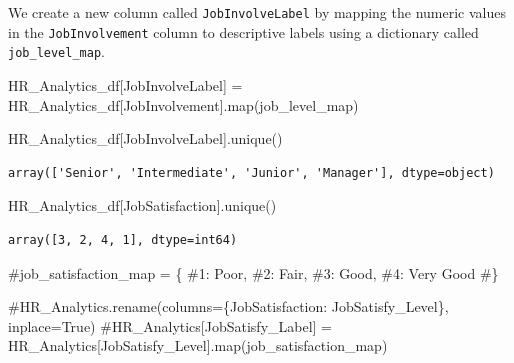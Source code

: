 \documentclass[
  letterpaper,
  DIV=11,
  numbers=noendperiod]{scrartcl}
\newenvironment{Shaded}{\begin{snugshade}}{\end{snugshade}}
\newcommand{\BuiltInTok}[1]{\textcolor[rgb]{0.00,0.23,0.31}{#1}}
\newcommand{\CommentTok}[1]{\textcolor[rgb]{0.37,0.37,0.37}{#1}}
\newcommand{\NormalTok}[1]{\textcolor[rgb]{0.00,0.23,0.31}{#1}}
\newcommand{\OperatorTok}[1]{\textcolor[rgb]{0.37,0.37,0.37}{#1}}
\newcommand{\StringTok}[1]{\textcolor[rgb]{0.13,0.47,0.30}{#1}}
\begin{document}
We create a new column called \texttt{JobInvolveLabel} by mapping the
numeric values in the \texttt{JobInvolvement} column to descriptive
labels using a dictionary called \texttt{job\_level\_map}.

\begin{Shaded}
\begin{Highlighting}[]
\NormalTok{HR\_Analytics\_df[}\StringTok{\textquotesingle{}JobInvolveLabel\textquotesingle{}}\NormalTok{] }\OperatorTok{=}\NormalTok{ HR\_Analytics\_df[}\StringTok{\textquotesingle{}JobInvolvement\textquotesingle{}}\NormalTok{].}\BuiltInTok{map}\NormalTok{(job\_level\_map)}
\end{Highlighting}
\end{Shaded}

\begin{Shaded}
\begin{Highlighting}[]
\NormalTok{HR\_Analytics\_df[}\StringTok{\textquotesingle{}JobInvolveLabel\textquotesingle{}}\NormalTok{].unique()}
\end{Highlighting}
\end{Shaded}

\begin{verbatim}
array(['Senior', 'Intermediate', 'Junior', 'Manager'], dtype=object)
\end{verbatim}

\begin{Shaded}
\begin{Highlighting}[]
\NormalTok{HR\_Analytics\_df[}\StringTok{\textquotesingle{}JobSatisfaction\textquotesingle{}}\NormalTok{].unique()}
\end{Highlighting}
\end{Shaded}

\begin{verbatim}
array([3, 2, 4, 1], dtype=int64)
\end{verbatim}

\begin{Shaded}
\begin{Highlighting}[]
\CommentTok{\#job\_satisfaction\_map = \{}
    \CommentTok{\#1: \textquotesingle{}Poor\textquotesingle{},}
    \CommentTok{\#2: \textquotesingle{}Fair\textquotesingle{},}
    \CommentTok{\#3: \textquotesingle{}Good\textquotesingle{},}
    \CommentTok{\#4: \textquotesingle{}Very Good\textquotesingle{}}
\CommentTok{\#\}}
\end{Highlighting}
\end{Shaded}

\begin{Shaded}
\begin{Highlighting}[]
\CommentTok{\#HR\_Analytics.rename(columns=\{\textquotesingle{}JobSatisfaction\textquotesingle{}: \textquotesingle{}JobSatisfy\_Level\textquotesingle{}\}, inplace=True)}
\CommentTok{\#HR\_Analytics[\textquotesingle{}JobSatisfy\_Label\textquotesingle{}] = HR\_Analytics[\textquotesingle{}JobSatisfy\_Level\textquotesingle{}].map(job\_satisfaction\_map)}
\end{Highlighting}
\end{Shaded}
\end{document}
